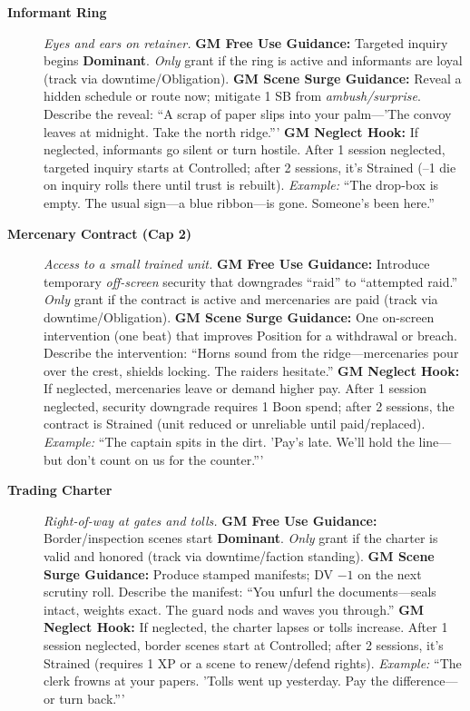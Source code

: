 \begin{description}
  \item[\textbf{Informant Ring}]   
        \emph{Eyes and ears on retainer.}  
        \textbf{GM Free Use Guidance:} Targeted inquiry begins \textbf{Dominant}. \emph{Only} grant if the ring is active and informants are loyal (track via downtime/Obligation).  
        \textbf{GM Scene Surge Guidance:} Reveal a hidden schedule or route now; mitigate 1 SB from \emph{ambush/surprise}. Describe the reveal: ``A scrap of paper slips into your palm---'The convoy leaves at midnight. Take the north ridge.'''  
        \textbf{GM Neglect Hook:} If neglected, informants go silent or turn hostile. After 1 session neglected, targeted inquiry starts at Controlled; after 2 sessions, it's Strained (--1 die on inquiry rolls there until trust is rebuilt).  
        \textit{Example:} ``The drop-box is empty. The usual sign---a blue ribbon---is gone. Someone's been here.''  

  \item[\textbf{Mercenary Contract (Cap 2)}]   
        \emph{Access to a small trained unit.}  
        \textbf{GM Free Use Guidance:} Introduce temporary \emph{off-screen} security that downgrades ``raid'' to ``attempted raid.'' \emph{Only} grant if the contract is active and mercenaries are paid (track via downtime/Obligation).  
        \textbf{GM Scene Surge Guidance:} One on-screen intervention (one beat) that improves Position for a withdrawal or breach. Describe the intervention: ``Horns sound from the ridge---mercenaries pour over the crest, shields locking. The raiders hesitate.''  
        \textbf{GM Neglect Hook:} If neglected, mercenaries leave or demand higher pay. After 1 session neglected, security downgrade requires 1 Boon spend; after 2 sessions, the contract is Strained (unit reduced or unreliable until paid/replaced).  
        \textit{Example:} ``The captain spits in the dirt. 'Pay's late. We'll hold the line---but don't count on us for the counter.'''  

  \item[\textbf{Trading Charter}]   
        \emph{Right-of-way at gates and tolls.}  
        \textbf{GM Free Use Guidance:} Border/inspection scenes start \textbf{Dominant}. \emph{Only} grant if the charter is valid and honored (track via downtime/faction standing).  
        \textbf{GM Scene Surge Guidance:} Produce stamped manifests; DV $-1$ on the next scrutiny roll. Describe the manifest: ``You unfurl the documents---seals intact, weights exact. The guard nods and waves you through.''  
        \textbf{GM Neglect Hook:} If neglected, the charter lapses or tolls increase. After 1 session neglected, border scenes start at Controlled; after 2 sessions, it's Strained (requires 1 XP or a scene to renew/defend rights).  
        \textit{Example:} ``The clerk frowns at your papers. 'Tolls went up yesterday. Pay the difference---or turn back.'''  


\end{description}
